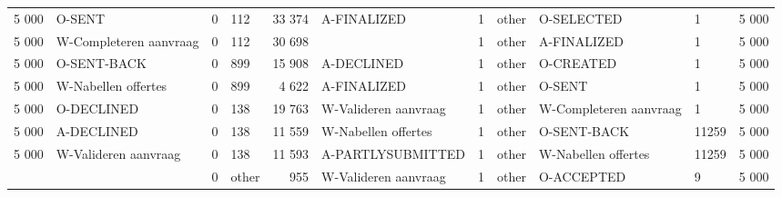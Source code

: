 \begin{tabular}{llllrlllllr}
5 000 & O-SENT & 0 & 112 & 33 374 & A-FINALIZED & 1 & other & O-SELECTED & 1 & 5 000 \\
5 000 & W-Completeren aanvraag & 0 & 112 & 30 698 &  & 1 & other & A-FINALIZED & 1 & 5 000 \\
5 000 & O-SENT-BACK & 0 & 899 & 15 908 & A-DECLINED & 1 & other & O-CREATED & 1 & 5 000 \\
5 000 & W-Nabellen offertes & 0 & 899 & 4 622 & A-FINALIZED & 1 & other & O-SENT & 1 & 5 000 \\
5 000 & O-DECLINED & 0 & 138 & 19 763 & W-Valideren aanvraag & 1 & other & W-Completeren aanvraag & 1 & 5 000 \\
5 000 & A-DECLINED & 0 & 138 & 11 559 & W-Nabellen offertes & 1 & other & O-SENT-BACK & 11259 & 5 000 \\
5 000 & W-Valideren aanvraag & 0 & 138 & 11 593 & A-PARTLYSUBMITTED & 1 & other & W-Nabellen offertes & 11259 & 5 000 \\
 &  & 0 & other & 955 & W-Valideren aanvraag & 1 & other & O-ACCEPTED & 9 & 5 000 \\
\bottomrule
\end{tabular}
